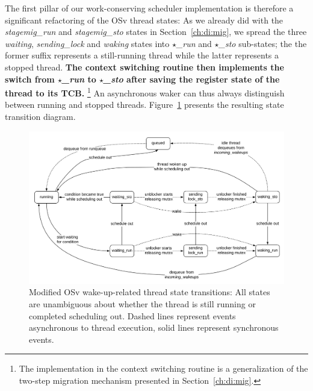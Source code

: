 \documentclass[12pt,a4paper]{book}
\begin{document}
The first pillar of our work-conserving scheduler implementation is therefore a significant refactoring of the OSv thread states:
As we already did with the \textit{stagemig\_run} and \textit{stagemig\_sto} states in Section~\ref{ch:di:mig},
we spread the three \textit{waiting}, \textit{sending\_lock} and \textit{waking} states into \textit{$\star$\_run} and \textit{$\star$\_sto} sub-states; the the former suffix represents a still-running thread while the latter represents a stopped thread.
\textbf{The context switching routine then implements the switch from \textit{$\star$\_run} to \textit{$\star$\_sto} after saving the register state of the thread to its TCB.}%
\footnote{The implementation in the context switching routine is a generalization of the two-step migration mechanism presented in Section~\ref{ch:di:mig}.}
An asynchronous waker can thus always distinguish between running and stopped threads.
Figure~\ref{fig:di:wake:spreadstates} presents the resulting state transition diagram.

\begin{figure}
    \centering
    \includegraphics[width=\textwidth]{fig_build/state_chart_post_spread}
    \caption{Modified OSv wake-up-related thread state transitions: All states are unambiguous about whether the thread is still running or completed scheduling out.
        Dashed lines represent events asynchronous to thread execution, solid lines represent synchronous events.
    }
    \label{fig:di:wake:spreadstates}
\end{figure}
\end{document}

